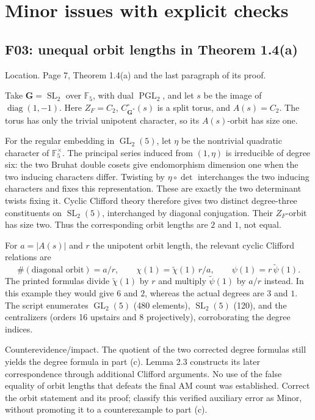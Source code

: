 \documentclass[10pt]{article}
\begin{document}
\section*{Minor issues with explicit checks}
\subsection*{F03: unequal orbit lengths in Theorem 1.4(a)}
Location. Page 7, Theorem 1.4(a) and the last paragraph of its proof.\par
Take \(\mathbf G=\operatorname{SL}_2\) over \(\mathbb F_5\), with dual \(\operatorname{PGL}_2\), and let \(s\) be the image of \(\operatorname{diag}(1,-1)\). Here \(Z_F=C_2\), \(C^\circ_{\mathbf G^*}(s)\) is a split torus, and \(A(s)=C_2\). The torus has only the trivial unipotent character, so its \(A(s)\)-orbit has size one.\par
For the regular embedding in \(\operatorname{GL}_2(5)\), let \(\eta\) be the nontrivial quadratic character of \(\mathbb F_5^\times\). The principal series induced from \((1,\eta)\) is irreducible of degree six: the two Bruhat double cosets give endomorphism dimension one when the two inducing characters differ. Twisting by \(\eta\circ\det\) interchanges the two inducing characters and fixes this representation. These are exactly the two determinant twists fixing it. Cyclic Clifford theory therefore gives two distinct degree-three constituents on \(\operatorname{SL}_2(5)\), interchanged by diagonal conjugation. Their \(Z_F\)-orbit has size two. Thus the corresponding orbit lengths are \(2\) and \(1\), not equal.\par
For \(a=|A(s)|\) and \(r\) the unipotent orbit length, the relevant cyclic Clifford relations are \[\#(\text{diagonal orbit})=a/r,\qquad
 \chi(1)=\widetilde\chi(1)\,r/a,\qquad
 \psi(1)=r\,\widetilde\psi(1).\] The printed formulas divide \(\widetilde\chi(1)\) by \(r\) and multiply \(\widetilde\psi(1)\) by \(a/r\) instead. In this example they would give \(6\) and \(2\), whereas the actual degrees are \(3\) and \(1\). The script enumerates \(\operatorname{GL}_2(5)\) (480 elements), \(\operatorname{SL}_2(5)\) (120), and the centralizers (orders 16 upstairs and 8 projectively), corroborating the degree indices.\par
Counterevidence/impact. The quotient of the two corrected degree formulas still yields the degree formula in part (c). Lemma 2.3 constructs its later correspondence through additional Clifford arguments. No use of the false equality of orbit lengths that defeats the final AM count was established. Correct the orbit statement and its proof; classify this verified auxiliary error as Minor, without promoting it to a counterexample to part (c).\par
\end{document}
